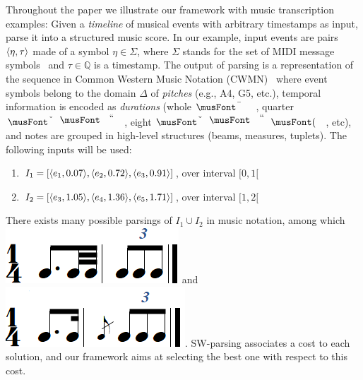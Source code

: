 \begin{example}\label{ex:running}
Throughout the paper we
illustrate our framework with music transcription examples: Given
a \emph{timeline} of musical events with arbitrary timestamps as input, parse it
into a structured music score. In our example, input events
are pairs $\< \eta, \tau>$ made of
a symbol $\eta \in \Sigma$, where $\Sigma$ stands for the
set of MIDI message symbols~\cite{?}
and  $\tau \in \mathbb{Q}$ is a timestamp. The output of parsing
is a representation of the sequence in
Common Western Music Notation (CWMN)~\cite{Gould11Notation}
where event symbols belong to the domain $\Delta$
of \emph{pitches} (e.g., A4, G5, etc.), temporal
information is encoded as \emph{durations} (whole $\musWhole$,
quarter $\musQuarter$, eight $\musEighth$, etc), and notes are grouped in
high-level structures (beams, measures, tuplets). The following inputs
will be used:
\begin{enumerate}
  \item $I_1  = [ \<e_1, 0.07>,\<e_2, 0.72>, \<e_3, 0.91>]$, over interval $[0,1[$
  \item $I_2  = [ \<e_3, 1.05>,\<e_4, 1.36>, \<e_5, 1.71>]$, over interval $[1,2[$
\end{enumerate}
There exists many possible parsings of $I_1 \cup I_2$ in music notation, among
which
\includegraphics[scale=0.20]{pictures/score5.png}
and \includegraphics[scale=0.20]{pictures/score4.png}.  
SW-parsing associates a cost 
to each solution, and our framework
aims at selecting the best one with respect to this cost.
\endex
\end{example}
